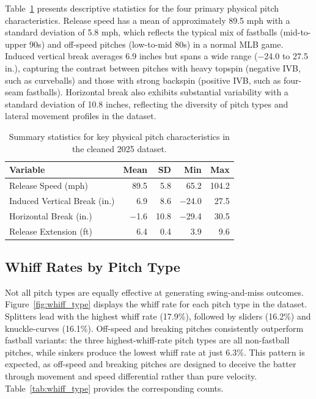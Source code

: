 \documentclass[11pt]{article}
\begin{document}
Table~\ref{tab:summary} presents descriptive statistics for the four primary physical pitch characteristics.
Release speed has a mean of approximately 89.5 mph with a standard deviation of 5.8 mph, which reflects the typical mix of fastballs (mid-to-upper 90s) and off-speed pitches (low-to-mid 80s) in a normal MLB game.
Induced vertical break averages 6.9 inches but spans a wide range ($-$24.0 to 27.5 in.), capturing the contrast between pitches with heavy topspin (negative IVB, such as curveballs) and those with strong backspin (positive IVB, such as four-seam fastballs).
Horizontal break also exhibits substantial variability with a standard deviation of 10.8 inches, reflecting the diversity of pitch types and lateral movement profiles in the dataset.

\begin{table}[H]
\centering
\begin{tabular}{lrrrr}
\toprule
Variable & Mean & SD & Min & Max \\
\midrule
Release Speed (mph)           & 89.5 & 5.8 & 65.2 & 104.2 \\
Induced Vertical Break (in.)  & 6.9 & 8.6 & $-$24.0 & 27.5 \\
Horizontal Break (in.)        & $-$1.6  & 10.8 & $-$29.4 & 30.5 \\
Release Extension (ft)        & 6.4  & 0.4 & 3.9 & 9.6 \\
\bottomrule
\end{tabular}
\caption{Summary statistics for key physical pitch characteristics in the cleaned 2025 dataset.}
\label{tab:summary}
\end{table}

\subsection{Whiff Rates by Pitch Type}

Not all pitch types are equally effective at generating swing-and-miss outcomes.
Figure~\ref{fig:whiff_type} displays the whiff rate for each pitch type in the dataset.
Splitters lead with the highest whiff rate (17.9\%), followed by sliders (16.2\%) and knuckle-curves (16.1\%).
Off-speed and breaking pitches consistently outperform fastball variants: the three highest-whiff-rate pitch types are all non-fastball pitches, while sinkers produce the lowest whiff rate at just 6.3\%.
This pattern is expected, as off-speed and breaking pitches are designed to deceive the batter through movement and speed differential rather than pure velocity.
Table~\ref{tab:whiff_type} provides the corresponding counts.
\end{document}

